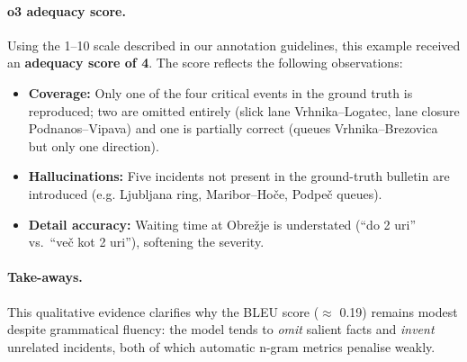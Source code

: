 \documentclass[fleqn,moreauthors,10pt]{ds_report}
\begin{document}
\paragraph{o3 adequacy score.}  
Using the 1–10 scale described in our annotation guidelines, this example received an \textbf{adequacy score of 4}.  The score reflects the following observations:

\begin{itemize}
  \item \textbf{Coverage:} Only one of the four critical events in the ground truth is reproduced; two are omitted entirely (slick lane Vrhnika–Logatec, lane closure Podnanos–Vipava) and one is partially correct (queues Vrhnika–Brezovica but only one direction).
  \item \textbf{Hallucinations:} Five incidents not present in the ground-truth bulletin are introduced (e.g. Ljubljana ring, Maribor–Hoče, Podpeč queues).
  \item \textbf{Detail accuracy:} Waiting time at Obrežje is understated (“do 2 uri” vs.\ “več kot 2 uri”), softening the severity.
\end{itemize}

\paragraph{Take-aways.}  
This qualitative evidence clarifies why the BLEU score ($\approx$ 0.19) remains modest despite grammatical fluency: the model tends to \emph{omit} salient facts and \emph{invent} unrelated incidents, both of which automatic n-gram metrics penalise weakly.  




\end{document}

